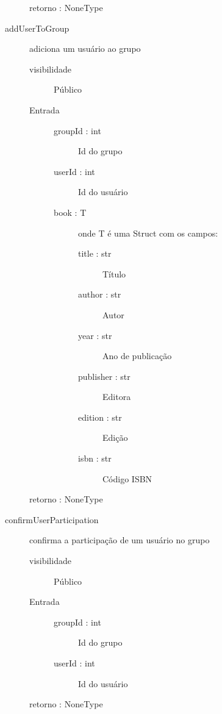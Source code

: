 \documentclass[a4paper]{article}
\begin{document}
\begin{description}
\begin{description}
			 \item [retorno : NoneType ]
				
			\end{description} %
			
			\item [addUserToGroup] adiciona um usuário ao grupo
			\begin{description} %
			 \item [visibilidade] Público
			 \item [Entrada] \mbox{}
				\begin{description} %
				 \item [groupId : int] Id do grupo
				 \item [userId : int] Id do usuário
				 \item [book : T] onde T é uma Struct com os campos:
					\begin{description} 
					\item [title : str] Título
					\item [author : str] Autor
					\item [year : str] Ano de publicação
					\item [publisher : str] Editora
					\item [edition : str] Edição
					\item [isbn : str] Código ISBN
					\end{description} 
				\end{description} %
				
			 \item [retorno : NoneType ]
				
			\end{description} %
			
			\item [confirmUserParticipation] confirma a participação de um usuário no grupo
			\begin{description} %
			 \item [visibilidade] Público
			 \item [Entrada] \mbox{}
				\begin{description} %
				 \item [groupId : int] Id do grupo
				 \item [userId : int] Id do usuário
				\end{description} %
				
			 \item [retorno : NoneType ]
				

\end{description}
\end{description}
\end{document}
